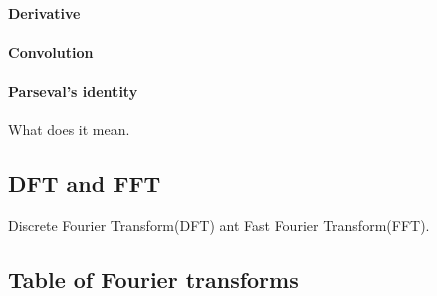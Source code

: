 \paragraph{Derivative}
\paragraph{Convolution}


\paragraph{Parseval's identity}
What does it mean.


\subsection{DFT and FFT}
Discrete Fourier Transform(DFT) ant Fast Fourier Transform(FFT).

\subsection{Table of Fourier transforms}
